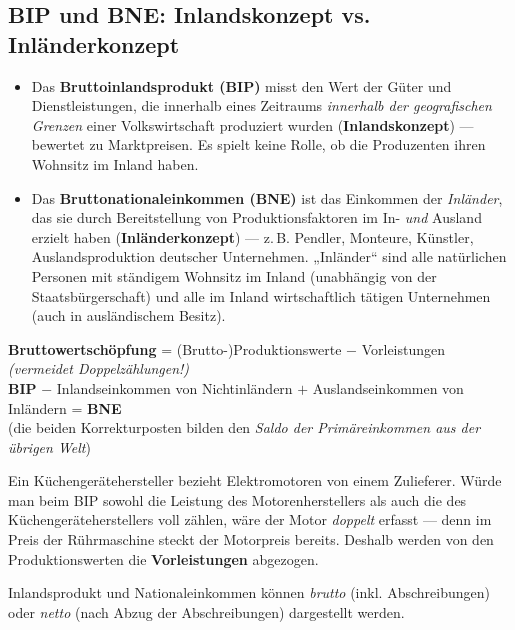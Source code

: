 \documentclass[11pt, a4paper]{article}
\begin{document}
\subsection{BIP und BNE: Inlandskonzept vs. Inländerkonzept}

\begin{itemize}
  \item Das \textbf{Bruttoinlandsprodukt (BIP)} misst den Wert der Güter und
    Dienstleistungen, die innerhalb eines Zeitraums \emph{innerhalb der geografischen
    Grenzen} einer Volkswirtschaft produziert wurden (\textbf{Inlandskonzept}) ---
    bewertet zu Marktpreisen. Es spielt keine Rolle, ob die Produzenten ihren Wohnsitz
    im Inland haben.
  \item Das \textbf{Bruttonationaleinkommen (BNE)} ist das Einkommen der \emph{Inländer},
    das sie durch Bereitstellung von Produktionsfaktoren im In- \emph{und} Ausland
    erzielt haben (\textbf{Inländerkonzept}) --- z.\,B. Pendler, Monteure, Künstler,
    Auslandsproduktion deutscher Unternehmen. „Inländer`` sind alle natürlichen Personen
    mit ständigem Wohnsitz im Inland (unabhängig von der Staatsbürgerschaft) und alle im
    Inland wirtschaftlich tätigen Unternehmen (auch in ausländischem Besitz).
\end{itemize}

\begin{merksatz}[title={\bfseries Formeln: Bruttowertschöpfung und BNE}]
\textbf{Bruttowertschöpfung} = (Brutto-)Produktionswerte $-$ Vorleistungen
\emph{(vermeidet Doppelzählungen!)}\\[0.4em]
\textbf{BIP} $-$ Inlandseinkommen von Nichtinländern $+$ Auslandseinkommen von Inländern
= \textbf{BNE}\\
(die beiden Korrekturposten bilden den \emph{Saldo der Primäreinkommen aus der übrigen
Welt})
\end{merksatz}

\begin{beispiel}
Ein Küchengerätehersteller bezieht Elektromotoren von einem Zulieferer. Würde man beim
BIP sowohl die Leistung des Motorenherstellers als auch die des Küchengeräteherstellers
voll zählen, wäre der Motor \emph{doppelt} erfasst --- denn im Preis der Rührmaschine
steckt der Motorpreis bereits. Deshalb werden von den Produktionswerten die
\textbf{Vorleistungen} abgezogen.
\end{beispiel}

Inlandsprodukt und Nationaleinkommen können \emph{brutto} (inkl. Abschreibungen) oder
\emph{netto} (nach Abzug der Abschreibungen) dargestellt werden.
\end{document}
